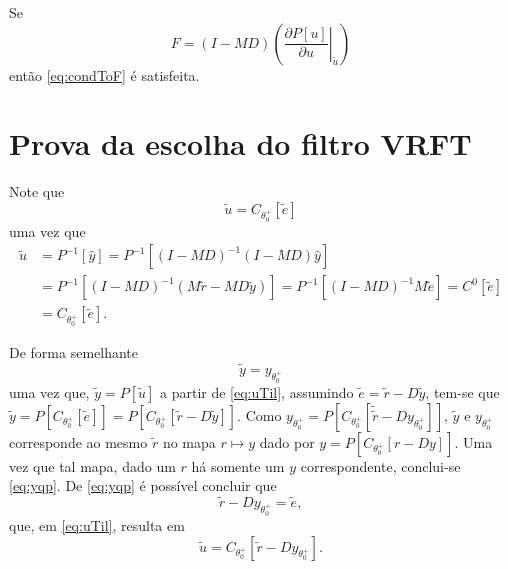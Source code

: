 \begin{theorem}
   Se 
   \begin{equation}
       F=(I-M D)\left(\left.\frac{\partial P[u]}{\partial u}\right|_{\tilde{u}}\right)
       \label{eq:FiltroVRFTNL}
   \end{equation}
   então \eqref{eq:condToF} é satisfeita.
\end{theorem}


\section{Prova da escolha do filtro VRFT}%
\label{sec:prova_da_escolha_do_filtro_vrft}
Note que
\begin{equation}
\tilde{u}=C_{\theta_{0}^{+}}[\tilde{e}]
\label{eq:uTil}
\end{equation}
uma vez que
\begin{align}
   \tilde{u}&=P^{-1}[\hat{y}]=P^{-1}\left[(I-M D)^{-1}(I-M D) \hat{y}\right] \nonumber\\
            &= P^{-1}\left[(I-M D)^{-1}(M \tilde{r}-M D \tilde{y})\right]=P^{-1}\left[(I-M D)^{-1} M \tilde{e}\right] = C^{0}[\tilde{e}] \nonumber\\
            &=C_{\theta_{0}^{+}}[\tilde{e}].
\end{align}

De forma semelhante
\begin{equation}
   \tilde{y}=y_{\theta_{0}^{+}}
\label{eq:yqp}
\end{equation}
uma vez que, $\tilde{y}=P[\tilde{u}]$ a partir de \eqref{eq:uTil}, assumindo $\tilde{e}=\tilde{r}-D \tilde{y}$,  tem-se que $\tilde{y}=P\left[C_{\theta_{0}^{+}}[\tilde{e}]\right]=$$P\left[C_{\theta_{0}^{+}}[\tilde{r}-D \tilde{y}]\right]$. Como
$y_{\theta_{0}^{+}}=P\left[C_{\theta_{0}^{+}}\left[\tilde{\tilde{r}}-D y_{\theta_{0}^{+}}\right]\right]$, 
$\tilde{y}$ e $y_{\theta_{0}^{+}}$ corresponde ao mesmo $\tilde{r}$ no mapa $r \mapsto y$ dado por $y=P\left[C_{\theta_{0}^{+}}[r-D y]\right]$.
Uma vez que tal mapa, dado um $r$ há somente um $y$ correspondente, conclui-se \eqref{eq:yqp}.
De \eqref{eq:yqp} é possível concluir que 
\begin{equation}
   \tilde{r}-D y_{\theta_{0}^{+}}=\tilde{e},
\label{eq:eTil}
\end{equation}
que, em \eqref{eq:uTil}, resulta em
\begin{equation}
\tilde{u}=C_{\theta_{0}^{+}}\left[\tilde{r}-D y_{\theta_{0}^{+}}\right].
\label{eq:uTil_2}
\end{equation}

